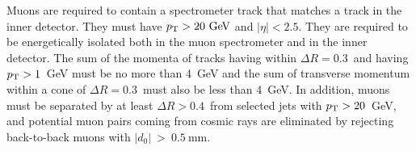 

Muons are required to contain a spectrometer track that matches a track in the inner detector.
They must have $\pt>20\GeV$ and $|\eta|<2.5$.
They are required to be energetically isolated both in the muon spectrometer and in the
inner detector.
The sum of the momenta of tracks having within $\Delta R = 0.3$\ and having $p_{\mathrm{T}}>1$~GeV
must be no more than 4~GeV and the sum of transverse momentum within
a cone of $\Delta R = 0.3$\ must also be less than 4~GeV.
In addition, muons must be separated by at least $\Delta R > 0.4$\ from
selected jets with $p_{\mathrm{T}}>20$~GeV, and potential muon pairs coming from
cosmic rays are eliminated by rejecting back-to-back muons with $|d_0|~>~0.5~$mm.



